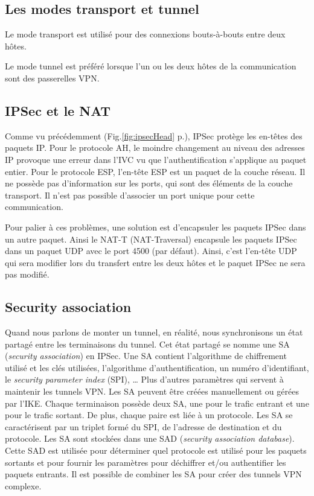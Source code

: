 \subsection{Les modes transport et tunnel}
Le mode transport est utilisé pour des connexions bouts-à-bouts entre deux hôtes.

Le mode tunnel est préféré lorsque l'un ou les deux hôtes de la communication sont des passerelles VPN.

\subsection{IPSec et le NAT}
Comme vu précédemment (Fig.\ref{fig:ipsecHead} p.\pageref{fig:ipsecHead}), IPSec protège les en-têtes des paquets IP.
Pour le protocole AH, le moindre changement au niveau des adresses IP provoque une erreur dans l'IVC vu que l'authentification s'applique au paquet entier.
Pour le protocole ESP, l'en-tête ESP est un paquet de la couche réseau. Il ne possède pas d'information sur les ports, qui sont des éléments de la couche transport.
Il n'est pas possible d'associer un port unique pour cette communication.

Pour palier à ces problèmes, une solution est d'encapsuler les paquets IPSec dans un autre paquet.
Ainsi le NAT-T (NAT-Traversal) encapsule les paquets IPSec dans un paquet UDP avec le port 4500 (par défaut).
Ainsi, c'est l'en-tête UDP qui sera modifier lors du transfert entre les deux hôtes et le paquet IPSec ne sera pas modifié.

\subsection{Security association}
Quand nous parlons de monter un tunnel, en réalité, nous synchronisons un état partagé entre les terminaisons du tunnel. 
Cet état partagé se nomme une SA (\textit{security association}) en IPSec. 
Une SA contient l'algorithme de chiffrement utilisé et les clés utilisées, l'algorithme d'authentification, un numéro d'identifiant, le \textit{security parameter index} (SPI), … 
Plus d'autres paramètres qui servent à maintenir les tunnels VPN. 
Les SA peuvent être créées manuellement ou gérées par l'IKE. 
Chaque terminaison possède deux SA, une pour le trafic entrant et une pour le trafic sortant. 
De plus, chaque paire est liée à un protocole. 
Les SA se caractérisent par un triplet formé du SPI, de l'adresse de destination et du protocole. 
Les SA sont stockées dans une SAD (\textit{security association database}). 
Cette SAD est utilisée pour déterminer quel protocole est utilisé pour les paquets sortants et pour fournir les paramètres pour déchiffrer et/ou authentifier les paquets entrants. 
Il est possible de combiner les SA pour créer des tunnels VPN complexe. 

